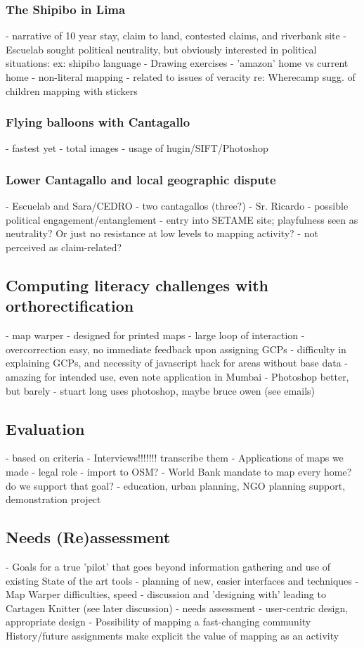 \documentclass[11pt]{report}
\begin{document}
\subsubsection{The Shipibo in Lima}
            - narrative of 10 year stay, claim to land, contested claims, and riverbank site
            - Escuelab sought political neutrality, but obviously interested in political situations: ex: shipibo language            - Drawing exercises
                - 'amazon' home vs current home
                - non-literal mapping - related to issues of veracity re: Wherecamp sugg. of children mapping with stickers
\subsubsection{Flying balloons with Cantagallo}
- fastest yet
                - total images
                - usage of hugin/SIFT/Photoshop
\subsubsection{Lower Cantagallo and local geographic dispute}
            - Escuelab and Sara/CEDRO
	- two cantagallos (three?)
            - Sr. Ricardo - possible political engagement/entanglement
            - entry into SETAME site; playfulness seen as neutrality? Or just no resistance at low levels to mapping activity?
                - not perceived as claim-related?
\subsection{Computing literacy challenges with orthorectification}
	- map warper
        - designed for printed maps
        - large loop of interaction - overcorrection easy, no immediate feedback upon assigning GCPs
        - difficulty in explaining GCPs, and necessity of javascript hack for areas without base data
        - amazing for intended use, even note application in Mumbai
    - Photoshop better, but barely
	- stuart long uses photoshop, maybe bruce owen (see emails)
\subsection{Evaluation}
- based on criteria
        - Interviews!!!!!!! transcribe them
        - Applications of maps we made
            - legal role
            - import to OSM?
            - World Bank mandate to map every home? do we support that goal?
            - education, urban planning, NGO planning support, demonstration project
\subsection{Needs (Re)assessment}
- Goals for a true 'pilot' that goes beyond information gathering and use of existing State of the art tools
   - planning of new, easier interfaces and techniques
                - Map Warper difficulties, speed
            - discussion and 'designing with' leading to Cartagen Knitter (see later discussion)
            - needs assessment - user-centric design, appropriate design
    - Possibility of mapping a fast-changing community
        History/future assignments make explicit the value of mapping as an activity
\end{document}
